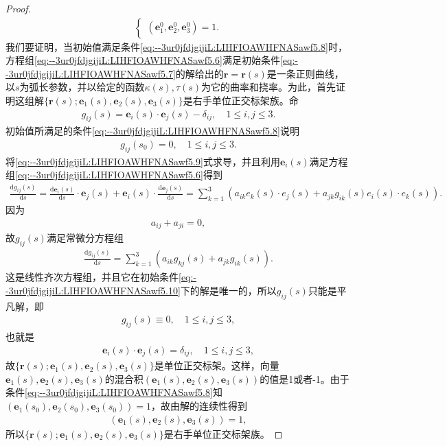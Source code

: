 \documentclass[../../main.tex]{subfiles}%
\begin{document}
\begin{proof}
\begin{align}
\begin{cases}
(\bm{e}_1^0,\bm{e}_2^0,\bm{e}_3^0) = 1.
\end{cases}
\label{eq:--3ur0jfdjgijiL:LIHFIOAWHFNASawf5.8}
\end{align}
我们要证明，当初始值满足条件\eqref{eq:--3ur0jfdjgijiL:LIHFIOAWHFNASawf5.8}时，方程组\eqref{eq:--3ur0jfdjgijiL:LIHFIOAWHFNASawf5.6}满足初始条件\eqref{eq:--3ur0jfdjgijiL:LIHFIOAWHFNASawf5.7}的解给出的$\bm{r} = \bm{r}(s)$是一条正则曲线，以$s$为弧长参数，并以给定的函数$\kappa(s),\tau(s)$为它的曲率和挠率。为此，首先证明这组解$\{\bm{r}(s);\bm{e}_1(s),\bm{e}_2(s),\bm{e}_3(s)\}$是右手单位正交标架族。命
\begin{align}
g_{ij}(s) = \bm{e}_i(s) \cdot \bm{e}_j(s) - \delta_{ij},\quad 1 \leqslant i,j \leqslant 3.
\label{eq:--3ur0jfdjgijiL:LIHFIOAWHFNASawf5.9}
\end{align}
初始值所满足的条件\eqref{eq:--3ur0jfdjgijiL:LIHFIOAWHFNASawf5.8}说明
\begin{align}
g_{ij}(s_0) = 0,\quad 1 \leqslant i,j \leqslant 3.
\label{eq:--3ur0jfdjgijiL:LIHFIOAWHFNASawf5.10}
\end{align}
将\eqref{eq:--3ur0jfdjgijiL:LIHFIOAWHFNASawf5.9}式求导，并且利用$\bm{e}_i(s)$满足方程组\eqref{eq:--3ur0jfdjgijiL:LIHFIOAWHFNASawf5.6}得到
\begin{align*}
\frac{\mathrm{d}g_{ij}\left( s \right)}{\mathrm{d}s}=\frac{\mathrm{d}\boldsymbol{e}_i\left( s \right)}{\mathrm{d}s}\cdot \boldsymbol{e}_j\left( s \right) +\boldsymbol{e}_i\left( s \right) \cdot \frac{\mathrm{d}\boldsymbol{e}_j\left( s \right)}{\mathrm{d}s}=\sum_{k=1}^3{\left( a_{ik}e_k\left( s \right) \cdot e_j\left( s \right) +a_{jk}g_{ik}\left( s \right) e_i\left( s \right) \cdot e_k\left( s \right) \right)}.
\end{align*}
因为
\begin{align*}
a_{ij} + a_{ji} = 0,
\end{align*}
故$g_{ij}(s)$满足常微分方程组
\begin{align*}
\frac{\mathrm{d}g_{ij}(s)}{\mathrm{d}s} = \sum\limits_{k=1}^3 (a_{ik}g_{kj}(s) + a_{jk}g_{ik}(s)).
\end{align*}
这是线性齐次方程组，并且它在初始条件\eqref{eq:--3ur0jfdjgijiL:LIHFIOAWHFNASawf5.10}下的解是唯一的，所以$g_{ij}(s)$只能是平凡解，即
\begin{align*}
g_{ij}(s) \equiv 0,\quad 1 \leqslant i,j \leqslant 3,
\end{align*}
也就是
\begin{align*}
\bm{e}_i(s) \cdot \bm{e}_j(s) = \delta_{ij},\quad 1 \leqslant i,j \leqslant 3,
\end{align*}
故$\{\bm{r}(s);\bm{e}_1(s),\bm{e}_2(s),\bm{e}_3(s)\}$是单位正交标架。这样，向量$\bm{e}_1(s),\bm{e}_2(s),\bm{e}_3(s)$的混合积$(\bm{e}_1(s),\bm{e}_2(s),\bm{e}_3(s))$的值是1或者-1。由于条件\eqref{eq:--3ur0jfdjgijiL:LIHFIOAWHFNASawf5.8}知$(\bm{e}_1(s_0),\bm{e}_2(s_0),\bm{e}_3(s_0)) = 1$，故由解的连续性得到
\begin{align*}
(\bm{e}_1(s),\bm{e}_2(s),\bm{e}_3(s)) = 1,
\end{align*}
所以$\{\bm{r}(s);\bm{e}_1(s),\bm{e}_2(s),\bm{e}_3(s)\}$是右手单位正交标架族。


\end{proof}
\end{document}

